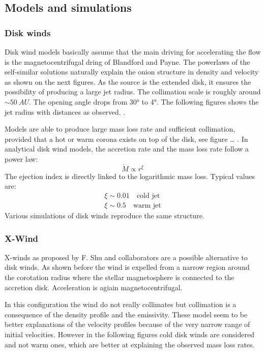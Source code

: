 \documentclass[10pt,a4paper,english,draft]{article}
\begin{document}
\subsection{Models and simulations}

\subsubsection{Disk winds}
Disk wind models basically assume that the main driving for accelerating the flow is the magnetocentrifugal dring of Blandford and Payne. The powerlaws of the self-similar solutions naturally explain the onion structure in density and velocity as shown on the next figures.
As the source is the extended disk, it ensures the possibility of producing a large jet radius. The collimation scale is roughly around $\sim \SI{50}{AU}$. The opening angle drops from \ang{30} to \ang{4}. The following figures shows the jet radius with distances as observed. .

Models are able to produce large mass loss rate and sufficient collimation, provided that a hot or warm corona exists on top of the disk, see figure … . In analytical disk wind models, the accretion rate and the mass loss rate follow a power law:
\begin{equation}
  \dot{M} \propto r^\xi
\end{equation}
The ejection index is directly linked to the logarithmic mass loss. Typical values are:
\begin{align}
  \xi \sim 0.01 \quad \textrm{cold jet} \\
  \xi \sim 0.5 \quad \textrm{warm jet}
\end{align}
Various simulations of disk winds reproduce the same structure.
\subsubsection{X-Wind}
X-winds as proposed by F. Shu and collaborators are a possible alternative to disk winds. As shown before the wind is expelled from a narrow region around the corotation radius where the stellar magnetosphere is connected to the accretion disk. Acceleration is agiain magnetocentrifugal.

In this configuration the wind do not really collimates but collimation is a consequence of the density profile and the emissivity.
These model seem to be better explanations of the velocity profiles because of the very narrow range of initial velocities. However in the following figures  cold disk winds are considered and not warm ones, which are better at explaining the observed mass loss rates.
\end{document}
